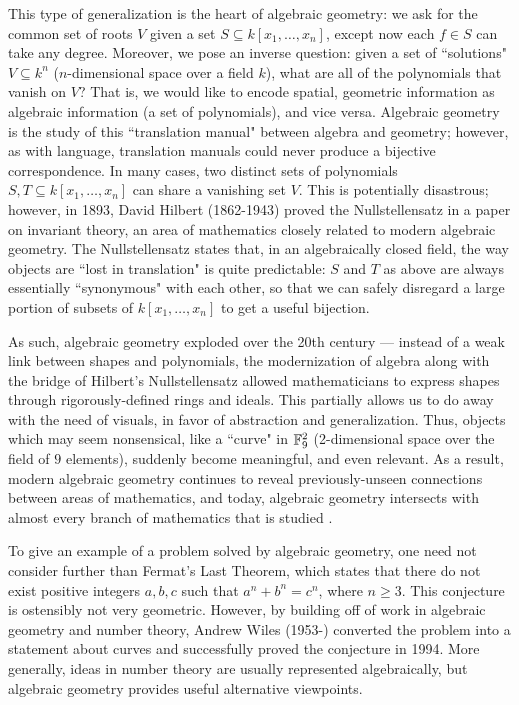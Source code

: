 \documentclass{article}
\begin{document}
This type of generalization is the heart of algebraic geometry: we ask for the common set of roots $V$ given a set $S\subseteq k[x_1, \ldots, x_n]$, except now each $f\in S$ can take any degree. Moreover, we pose an inverse question: given a set of ``solutions" $V\subseteq k^n$ ($n$-dimensional space over a field $k$), what are all of the polynomials that vanish on $V$? That is, we would like to encode spatial, geometric information as algebraic information (a set of polynomials), and vice versa. Algebraic geometry is the study of this ``translation manual" between algebra and geometry; however, as with language, translation manuals could never produce a bijective correspondence. In many cases, two distinct sets of polynomials $S, T\subseteq k[x_1, \ldots, x_n]$ can share a vanishing set $V$. This is potentially disastrous; however, in 1893, David Hilbert (1862-1943) proved the Nullstellensatz in a paper on invariant theory, an area of mathematics closely related to modern algebraic geometry. The Nullstellensatz states that, in an algebraically closed field, the way objects are ``lost in translation" is quite predictable: $S$ and $T$ as above are always essentially ``synonymous" with each other, so that we can safely disregard a large portion of subsets of $k[x_1, \ldots, x_n]$ to get a useful bijection.

As such, algebraic geometry exploded over the 20th century --- instead of a weak link between shapes and polynomials, the modernization of algebra along with the bridge of Hilbert's Nullstellensatz allowed mathematicians to express shapes through rigorously-defined rings and ideals. This partially allows us to do away with the need of visuals, in favor of abstraction and generalization. Thus, objects which may seem nonsensical, like a ``curve" in $\mathbb F_9^2$ (2-dimensional space over the field of $9$ elements), suddenly become meaningful, and even relevant. As a result, modern algebraic geometry continues to reveal previously-unseen connections between areas of mathematics, and today, algebraic geometry intersects with almost every branch of mathematics that is studied \cite{smith}.

To give an example of a problem solved by algebraic geometry, one need not consider further than Fermat's Last Theorem, which states that there do not exist positive integers $a,b,c$ such that $a^n + b^n = c^n$, where $n\geq 3$. This conjecture is ostensibly not very geometric. However, by building off of work in algebraic geometry and number theory, Andrew Wiles (1953-) converted the problem into a statement about {curves} and successfully proved the conjecture in 1994. More generally, ideas in number theory are usually represented algebraically, but algebraic geometry provides useful alternative viewpoints.
\end{document}
